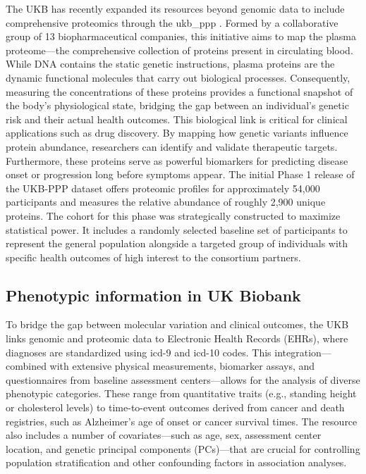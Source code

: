 The UKB has recently expanded its resources beyond genomic data to include comprehensive proteomics through the \gls{ukb_ppp} \cite{sun_plasma_2023}. Formed by a collaborative group of 13 biopharmaceutical companies, this initiative aims to map the plasma proteome—the comprehensive collection of proteins present in circulating blood. While DNA contains the static genetic instructions, plasma proteins are the dynamic functional molecules that carry out biological processes. Consequently, measuring the concentrations of these proteins provides a functional snapshot of the body's physiological state, bridging the gap between an individual's genetic risk and their actual health outcomes. This biological link is critical for clinical applications such as drug discovery. By mapping how genetic variants influence protein abundance, researchers can identify and validate therapeutic targets. Furthermore, these proteins serve as powerful biomarkers for predicting disease onset or progression long before symptoms appear.
The initial Phase 1 release of the UKB-PPP dataset offers proteomic profiles for approximately 54,000 participants and measures the relative abundance of roughly 2,900 unique proteins. The cohort for this phase was strategically constructed to maximize statistical power. It includes a randomly selected baseline set of participants to represent the general population alongside a targeted group of individuals with specific health outcomes of high interest to the consortium partners.

\subsection{Phenotypic information in UK Biobank}
To bridge the gap between molecular variation and clinical outcomes, the UKB links genomic and proteomic data to Electronic Health Records (EHRs), where diagnoses are standardized using \acrshort{icd}-9 and \acrshort{icd}-10 codes. This integration---combined with extensive physical measurements, biomarker assays, and questionnaires from baseline assessment centers---allows for the analysis of diverse phenotypic categories. These range from quantitative traits (e.g., standing height or cholesterol levels) to time-to-event outcomes derived from cancer and death registries, such as Alzheimer's age of onset or cancer survival times. The resource also includes a number of covariates—such as age, sex, assessment center location, and genetic principal components (PCs)—that are crucial for controlling population stratification and other confounding factors in association analyses.

